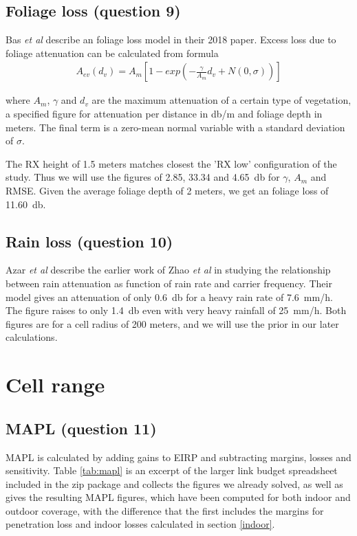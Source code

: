 \documentclass{article}
\begin{document}
\subsection{Foliage loss (question 9)}
Bas \textit{et al} describe an foliage loss model in their 2018 paper. Excess loss due to foliage attenuation can be calculated from formula
\begin{gather*}
    A_{ev}(d_v) = A_m [1-exp(-\frac{\gamma}{A_m}d_v + N(0,\sigma))]
\end{gather*}

where \(A_{m}\), \(\gamma\) and \(d_v\) are the maximum attenuation of a certain type of vegetation, a specified figure for attenuation per distance in \si{\decibel / \metre} and foliage depth in meters. The final term is a zero-mean normal variable with a standard deviation of \(\sigma\).

The RX height of 1.5 meters matches closest the 'RX low' configuration of the study. Thus we will use the figures of 2.85, 33.34 and \SI{4.65}{\decibel} for \(\gamma\), \(A_m\) and RMSE. Given the average foliage depth of 2 meters, we get an foliage loss of \SI{11.60}{\decibel}.

\subsection{Rain loss (question 10)}
Azar \textit{et al} describe the earlier work of Zhao \textit{et al} in studying the relationship between rain attenuation as function of rain rate and carrier frequency. Their model gives an attenuation of only \SI{0.6}{\decibel} for a heavy rain rate of \SI{7.6}{\milli\metre / \hour}. The figure raises to only \SI{1.4}{\decibel} even with very heavy rainfall of \SI{25}{\milli\metre / \hour}. Both figures are for a cell radius of 200 meters, and we will use the prior in our later calculations.

\section{Cell range}
\label{cell_r}

\subsection{MAPL (question 11)}
MAPL is calculated by adding gains to EIRP and subtracting margins, losses and sensitivity. Table \ref{tab:mapl} is an excerpt of the larger link budget spreadsheet included in the zip package and collects the figures we already solved, as well as gives the resulting MAPL figures, which have been computed for both indoor and outdoor coverage, with the difference that the first includes the margins for penetration loss and indoor losses calculated in section \ref{indoor}.
\end{document}
